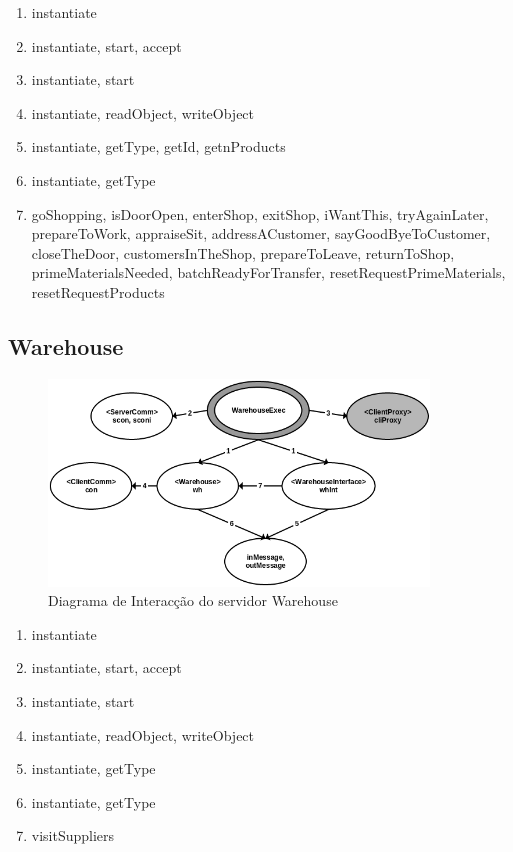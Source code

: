 \documentclass[11pt,a4paper]{report}
\begin{document}
\begin{enumerate}
\itemsep-0.4em 
\item instantiate
\item instantiate, start, accept
\item instantiate, start
\item instantiate, readObject, writeObject
\item instantiate, getType, getId, getnProducts
\item instantiate, getType
\item goShopping, isDoorOpen, enterShop, exitShop, iWantThis, tryAgainLater, prepareToWork, appraiseSit, addressACustomer, sayGoodByeToCustomer, closeTheDoor, customersInTheShop, prepareToLeave, returnToShop, primeMaterialsNeeded, batchReadyForTransfer, resetRequestPrimeMaterials, resetRequestProducts
\end{enumerate}
\newpage
\subsection{Warehouse}

\begin{figure}[h]
    \centering
    \includegraphics[width=0.9\textwidth]{images/warehouse.png}
    \caption{Diagrama de Interacção do servidor Warehouse}
    \label{fig:awesome_image}
\end{figure}

\begin{enumerate}
\itemsep-0.4em 
\item instantiate
\item instantiate, start, accept
\item instantiate, start
\item instantiate, readObject, writeObject
\item instantiate, getType
\item instantiate, getType
\item visitSuppliers
\end{enumerate}
\newpage
\end{document}
